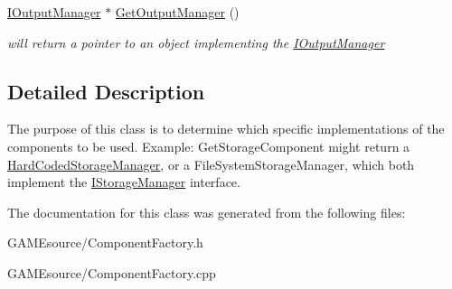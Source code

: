\begin{DoxyCompactItemize}
\mbox{\label{class_component_factory_a19583d4fc53d5942e5c0558a52809086}} 
\mbox{\hyperlink{class_i_output_manager}{I\+Output\+Manager}} $\ast$ \mbox{\hyperlink{class_component_factory_a19583d4fc53d5942e5c0558a52809086}{Get\+Output\+Manager}} ()
\begin{DoxyCompactList}\small\item\em will return a pointer to an object implementing the \mbox{\hyperlink{class_i_output_manager}{I\+Output\+Manager}} \end{DoxyCompactList}\end{DoxyCompactItemize}


\subsection{Detailed Description}
The purpose of this class is to determine which specific implementations of the components to be used. Example\+: Get\+Storage\+Component might return a \mbox{\hyperlink{class_hard_coded_storage_manager}{Hard\+Coded\+Storage\+Manager}}, or a File\+System\+Storage\+Manager, which both implement the \mbox{\hyperlink{class_i_storage_manager}{I\+Storage\+Manager}} interface. 

The documentation for this class was generated from the following files\+:\begin{DoxyCompactItemize}
\item 
G\+A\+M\+Esource/Component\+Factory.\+h\item 
G\+A\+M\+Esource/Component\+Factory.\+cpp\end{DoxyCompactItemize}
